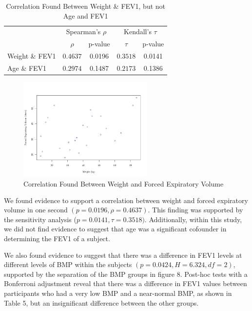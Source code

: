 \documentclass{article}
\begin{document}
		\begin{table}[h]
			\centering
			\footnotesize
			\renewcommand{\arraystretch}{1.2}
			\caption{Correlation Found Between Weight \& FEV1, but not Age and FEV1}
			\begin{tabular}{lcccc}
				\toprule
				& \multicolumn{2}{c}{Spearman’s $\rho$} & \multicolumn{2}{c}{Kendall’s $\tau$} \\
				\cmidrule(lr){2-3} \cmidrule(lr){4-5}
				& $\rho$ & p-value & $\tau$ & p-value \\
				\midrule
				Weight \& FEV1 & $0.4637$ & 0.0196 & $0.3518$ & 0.0141 \\
				Age \& FEV1 & $0.2974$ & 0.1487 & $0.2173$ & 0.1386 \\
				\bottomrule
			\end{tabular}
		\end{table}

		\newpage

		\begin{figure}[h!]
			\centering
			\includegraphics[width=0.6\textwidth]{graph2/ScatterWeightFEV.png}
			\caption{Correlation Found Between Weight and Forced Expiratory Volume}
			\label{fig:histogram}
		\end{figure}


		We found evidence to support a correlation between weight and forced expiratory volume in one second $(p = 0.0196, \rho = 0.4637)$. This finding was supported by the sensitivity analysis ($p = 0.0141, \tau = 0.3518)$. Additionally, within this study, we did not find evidence to suggest that age was a significant cofounder in determining the FEV1 of a subject. 
		
		
		We also found evidence to suggest that there was a difference in FEV1 levels at different levels of BMP within the subjects $(p = 0.0424, H = 6.324, df = 2)$, supported by the separation of the BMP groups in figure 8. Post-hoc tests with a Bonferroni adjustment reveal that there was a difference in FEV1 values between participants who had a very low BMP and a near-normal BMP, as shown in Table 5, but an insignificant difference between the other groups.
\end{document}
